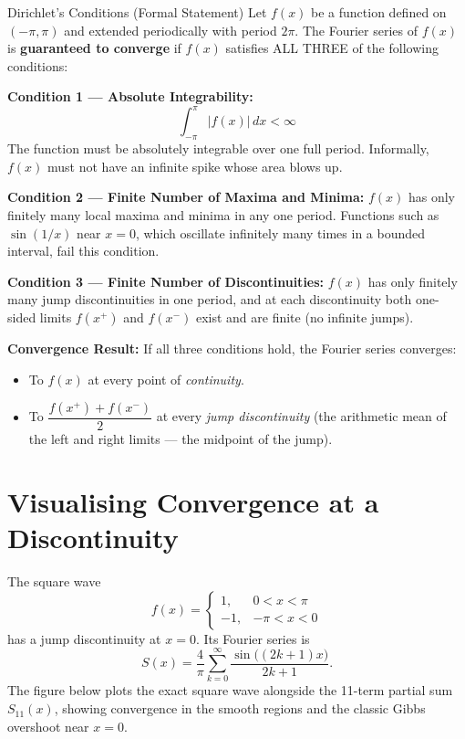 \documentclass[12pt,a4paper]{article}
\begin{document}
\begin{infobox}{Dirichlet's Conditions (Formal Statement)}
Let $f(x)$ be a function defined on $(-\pi, \pi)$ and extended periodically with period $2\pi$. The Fourier series of $f(x)$ is \textbf{guaranteed to converge} if $f(x)$ satisfies ALL THREE of the following conditions:

\medskip
\textbf{Condition 1 --- Absolute Integrability:}
\[
   \int_{-\pi}^{\pi} |f(x)|\, dx < \infty
\]
The function must be absolutely integrable over one full period. Informally, $f(x)$ must not have an infinite spike whose area blows up.

\medskip
\textbf{Condition 2 --- Finite Number of Maxima and Minima:}
$f(x)$ has only finitely many local maxima and minima in any one period. Functions such as $\sin(1/x)$ near $x=0$, which oscillate infinitely many times in a bounded interval, fail this condition.

\medskip
\textbf{Condition 3 --- Finite Number of Discontinuities:}
$f(x)$ has only finitely many jump discontinuities in one period, and at each discontinuity both one-sided limits $f(x^+)$ and $f(x^-)$ exist and are finite (no infinite jumps).

\bigskip
\textbf{Convergence Result:} If all three conditions hold, the Fourier series converges:
\begin{itemize}[noitemsep]
   \item To $f(x)$ at every point of \emph{continuity}.
   \item To $\dfrac{f(x^+)+f(x^-)}{2}$ at every \emph{jump discontinuity} (the arithmetic mean of the left and right limits --- the midpoint of the jump).
\end{itemize}
\end{infobox}

\section{Visualising Convergence at a Discontinuity}

The square wave
\[
   f(x) = \begin{cases} 1, & 0 < x < \pi \\ -1, & -\pi < x < 0 \end{cases}
\]
has a jump discontinuity at $x=0$. Its Fourier series is
\[
   S(x) = \frac{4}{\pi}\sum_{k=0}^{\infty} \frac{\sin\bigl((2k+1)x\bigr)}{2k+1}.
\]
The figure below plots the exact square wave alongside the 11-term partial sum $S_{11}(x)$, showing convergence in the smooth regions and the classic Gibbs overshoot near $x=0$.
\end{document}
